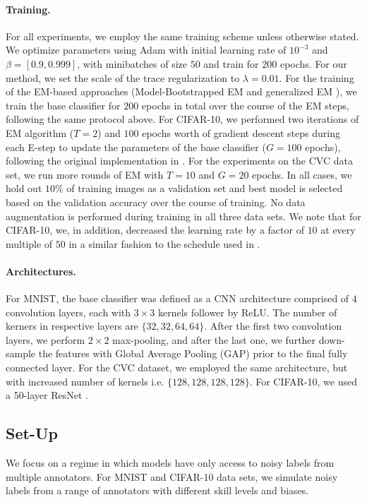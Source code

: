 \paragraph{Training. } For all experiments, we employ the same training scheme unless otherwise stated. We optimize parameters using Adam \cite{kingma2014adam} with initial learning rate of $10^{-3}$ and $\beta = [0.9, 0.999]$, with minibatches of size $50$ and train for $200$ epochs. For our method, we set the scale of the trace regularization to $\lambda=0.01$. For the training of the EM-based approaches (Model-Bootstrapped EM \cite{khetan2017learning} and generalized EM \cite{raykar2009supervised}), we train the base classifier for $200$ epochs in total over the course of the EM steps, following the same protocol above. For CIFAR-10, we performed two iterations of EM algorithm ($T=2$) and $100$ epochs worth of gradient descent steps during each E-step to update the parameters of the base classifier ($G=100$ epochs), following the original implementation in \cite{khetan2017learning}. For the experiments on the CVC data set, we run more rounds of EM with $T=10$ and $G=20 $ epochs. In all cases, we hold out $10\%$ of training images as a validation set and best model is selected based on the validation accuracy over the course of training. No data augmentation is performed during training in all three data sets. We note that for CIFAR-10, we, in addition, decreased the learning rate by a factor of $10$ at every multiple of $50$ in a similar fashion to the schedule used in \cite{Huang2017LearningDR,he2016deep,springenberg2014striving}.
\vspace{-2mm}
\paragraph{Architectures. } For MNIST, the base classifier was defined as a CNN architecture comprised of $4$ convolution layers, each with $3\times3$ kernels follower by ReLU. The number of kerners in respective layers are $\{32, 32, 64, 64\}$. After the first two convolution layers, we perform $2\times2$ max-pooling, and after the last one, we further down-sample the features with Global Average Pooling (GAP) prior to the final fully connected layer. For the CVC dataset, we employed the same architecture, but with increased number of kernels i.e. $\{128, 128, 128, 128\}$. For CIFAR-10, we used a 50-layer ResNet \cite{he2016deep}.



\subsection{Set-Up}
We focus on a regime in which models have only access to noisy labels from multiple annotators. For MNIST and CIFAR-10 data sets, we simulate noisy labels from a range of annotators with different skill levels and biases.

